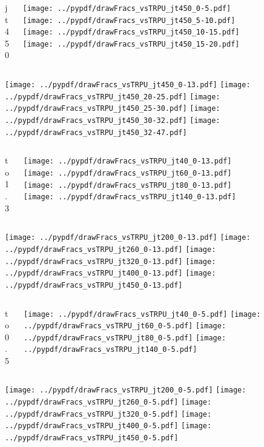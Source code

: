 \documentclass[aspectratio=169]{beamer}
\begin{document}
\begin{figure}[p]
\flushleft
\begin{columns}[T]
\begin{column}{.2\linewidth}
\centering
jt450
\end{column}
\begin{column}{.8\linewidth}
\texttt{[image: ../pypdf/drawFracs\_vsTRPU\_jt450\_0-5.pdf]}
\texttt{[image: ../pypdf/drawFracs\_vsTRPU\_jt450\_5-10.pdf]}
\texttt{[image: ../pypdf/drawFracs\_vsTRPU\_jt450\_10-15.pdf]}
\texttt{[image: ../pypdf/drawFracs\_vsTRPU\_jt450\_15-20.pdf]}
\end{column}
\end{columns}
\texttt{[image: ../pypdf/drawFracs\_vsTRPU\_jt450\_0-13.pdf]}
\texttt{[image: ../pypdf/drawFracs\_vsTRPU\_jt450\_20-25.pdf]}
\texttt{[image: ../pypdf/drawFracs\_vsTRPU\_jt450\_25-30.pdf]}
\texttt{[image: ../pypdf/drawFracs\_vsTRPU\_jt450\_30-32.pdf]}
\texttt{[image: ../pypdf/drawFracs\_vsTRPU\_jt450\_32-47.pdf]}
\end{figure}

\begin{figure}[p]
\flushleft
\begin{columns}[T]
\begin{column}{.2\linewidth}
 to 1.3
\end{column}
\begin{column}{.8\linewidth}
\texttt{[image: ../pypdf/drawFracs\_vsTRPU\_jt40\_0-13.pdf]}
\texttt{[image: ../pypdf/drawFracs\_vsTRPU\_jt60\_0-13.pdf]}
\texttt{[image: ../pypdf/drawFracs\_vsTRPU\_jt80\_0-13.pdf]}
\texttt{[image: ../pypdf/drawFracs\_vsTRPU\_jt140\_0-13.pdf]}
\end{column}
\end{columns}
\texttt{[image: ../pypdf/drawFracs\_vsTRPU\_jt200\_0-13.pdf]}
\texttt{[image: ../pypdf/drawFracs\_vsTRPU\_jt260\_0-13.pdf]}
\texttt{[image: ../pypdf/drawFracs\_vsTRPU\_jt320\_0-13.pdf]}
\texttt{[image: ../pypdf/drawFracs\_vsTRPU\_jt400\_0-13.pdf]}
\texttt{[image: ../pypdf/drawFracs\_vsTRPU\_jt450\_0-13.pdf]}
\end{figure}

\begin{figure}[p]
\flushleft
\begin{columns}[T]
\begin{column}{.2\linewidth}
 to 0.5
\end{column}
\begin{column}{.8\linewidth}
\texttt{[image: ../pypdf/drawFracs\_vsTRPU\_jt40\_0-5.pdf]}
\texttt{[image: ../pypdf/drawFracs\_vsTRPU\_jt60\_0-5.pdf]}
\texttt{[image: ../pypdf/drawFracs\_vsTRPU\_jt80\_0-5.pdf]}
\texttt{[image: ../pypdf/drawFracs\_vsTRPU\_jt140\_0-5.pdf]}
\end{column}
\end{columns}
\texttt{[image: ../pypdf/drawFracs\_vsTRPU\_jt200\_0-5.pdf]}
\texttt{[image: ../pypdf/drawFracs\_vsTRPU\_jt260\_0-5.pdf]}
\texttt{[image: ../pypdf/drawFracs\_vsTRPU\_jt320\_0-5.pdf]}
\texttt{[image: ../pypdf/drawFracs\_vsTRPU\_jt400\_0-5.pdf]}
\texttt{[image: ../pypdf/drawFracs\_vsTRPU\_jt450\_0-5.pdf]}
\end{figure}
\end{document}
